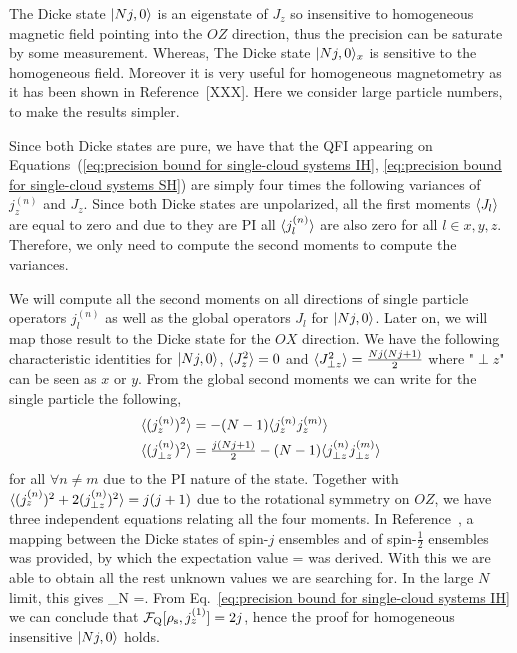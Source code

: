 The Dicke state $\vert Nj, 0 \rangle$ is an eigenstate of $J_z$ so insensitive to homogeneous magnetic field pointing into the $OZ$ direction, thus the precision can be saturate by some measurement.
Whereas, The Dicke state $\vert Nj, 0 \rangle_x$ is sensitive to the homogeneous field.
Moreover it is very useful for homogeneous magnetometry as it has been shown in Reference~[XXX].
Here we consider large particle numbers, to make the results simpler.

Since both Dicke states are pure, we have that
the QFI appearing on Equations~(\ref{eq:precision bound for single-cloud
systems IH}, \ref{eq:precision bound for single-cloud
systems SH}) are simply four times the following variances of $j_z^{(n)}$ and $J_z$.
Since both Dicke states are unpolarized, all the first moments $\langle J_l \rangle$ are equal to zero and due to they are PI all $\langle j_l^{(n)} \rangle$ are also zero for all $l\in x,y,z$.
Therefore, we only need to compute the second moments to compute the variances.


We will compute all the second moments on all directions of single particle operators $j_l^{(n)}$ as well as the global operators $J_l$ for $\vert Nj,0 \rangle$.
Later on, we will map those result to the Dicke state for the $OX$ direction.
We have the following characteristic identities for $\vert Nj,0 \rangle$, $\langle J_z^2 \rangle = 0$ and $\langle J_{\perp z}^2 \rangle = \frac{Nj(Nj+1)}{2}$ where "${\perp}{z}$" can be seen as $x$ or $y$.
From the global second moments we can write for the single particle the following,
\begin{align}
  \langle (j_z^{(n)})^2 \rangle &= -(N-1)\langle j_z^{(n)}j_z^{(m)} \rangle \\
  \langle (j_{\perp z}^{(n)})^2 \rangle &= \tfrac{j(Nj+1)}{2}-(N-1)\langle j_{\perp z}^{(n)}j_{\perp z}^{(m)} \rangle
\end{align}
for all $\forall n\neq m$ due to the PI nature of the state.
Together with $\langle (j_z^{(n)})^2+2(j_{\perp z}^{(n)})^2 \rangle = j(j+1)$ due to the rotational symmetry on $OZ$, we have three independent equations relating all the four moments.
In Reference~\cite{Urizar-lanz2013}, a mapping between the Dicke states of spin-$j$ ensembles and of spin-$\frac{1}{2}$ ensembles was provided, by which the expectation value
\be
  = 
\ee
was derived.
With this we are able to obtain all the rest unknown values we are searching for.
In the large $N$ limit, this gives
\be
\label{eq:jz2 for dicke state large number of particles}
\lim_{N \to \infty} =.
\ee
From Eq.~\eqref{eq:precision bound for single-cloud
systems IH} we can conclude that $\mathcal{F}_{\text{Q}}[\rho_{\rm s},j_z^{(1)}]=2j$,
hence the proof for homogeneous insensitive $\vert Nj,0 \rangle$ holds.


